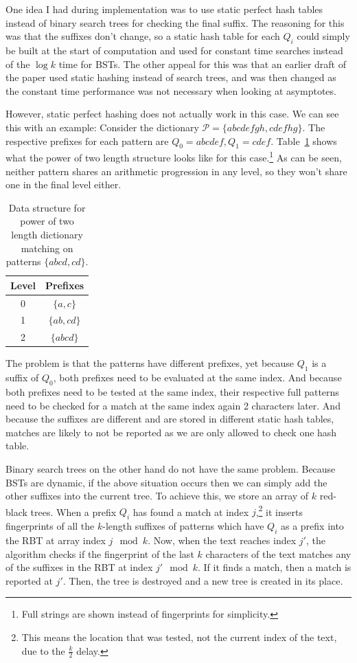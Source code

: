 \documentclass[ %
                    author={Dominic Joseph Moylett},
                    degree={MEng},
                     title={Dictionary Matching with Fingerprints},
                  subtitle={An Empirical Analysis},
                      type={Research},
                      year={2014} ]{dissertation}
\begin{document}
One idea I had during implementation was to use static perfect hash tables instead of binary search trees for checking the final suffix. The reasoning for this was that the suffixes don't change, so a static hash table for each $Q_i$ could simply be built at the start of computation and used for constant time searches instead of the $\log k$ time for BSTs. The other appeal for this was that an earlier draft of the paper used static hashing instead of search trees, and was then changed as the constant time performance was not necessary when looking at asymptotes.

However, static perfect hashing does not actually work in this case. We can see this with an example: Consider the dictionary $\mathcal{P} = \{abcdefgh, cdefhg\}$. The respective prefixes for each pattern are $Q_0 = abcdef, Q_1 = cdef$. Table~\ref{tab:static-hash-fail} shows what the power of two length structure looks like for this case.\footnote{Full strings are shown instead of fingerprints for simplicity.} As can be seen, neither pattern shares an arithmetic progression in any level, so they won't share one in the final level either.

\begin{table}[t]
  \centering
  \begin{tabular}{|c|c|}
    \hline
    Level & Prefixes \\\hline
    0 & $\{a, c\}$ \\\hline
    1 & $\{ab, cd\}$ \\\hline
    2 & $\{abcd\}$ \\\hline
  \end{tabular}
  \caption{Data structure for power of two length dictionary matching on patterns $\{abcd, cd\}$.}
  \label{tab:static-hash-fail}
\end{table}

The problem is that the patterns have different prefixes, yet because $Q_1$ is a suffix of $Q_0$, both prefixes need to be evaluated at the same index. And because both prefixes need to be tested at the same index, their respective full patterns need to be checked for a match at the same index again 2 characters later. And because the suffixes are different and are stored in different static hash tables, matches are likely to not be reported as we are only allowed to check one hash table.

Binary search trees on the other hand do not have the same problem. Because BSTs are dynamic, if the above situation occurs then we can simply add the other suffixes into the current tree. To achieve this, we store an array of $k$ red-black trees. When a prefix $Q_i$ has found a match at index $j$,\footnote{This means the location that was tested, not the current index of the text, due to the $\frac{k}{2}$ delay.} it inserts fingerprints of all the $k$-length suffixes of patterns which have $Q_i$ as a prefix into the RBT at array index $j \mod k$. Now, when the text reaches index $j'$, the algorithm checks if the fingerprint of the last $k$ characters of the text matches any of the suffixes in the RBT at index $j' \mod k$. If it finds a match, then a match is reported at $j'$. Then, the tree is destroyed and a new tree is created in its place.
\end{document}
